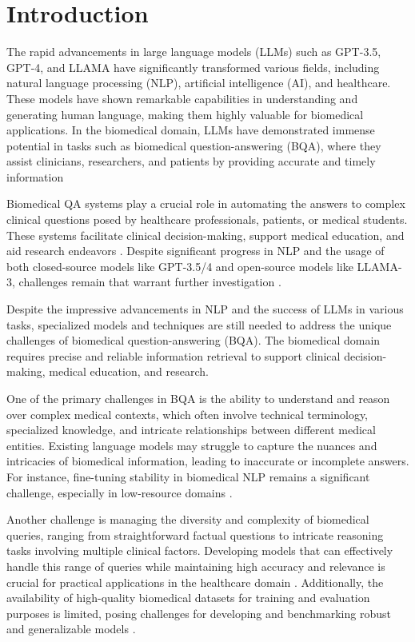\documentclass[onecolumn, conference]{IEEEtran}
\begin{document}
\section{Introduction}
The rapid advancements in large language models (LLMs) such as GPT-3.5, GPT-4, and LLAMA have significantly transformed various fields, including natural language processing (NLP), artificial intelligence (AI), and healthcare. These models have shown remarkable capabilities in understanding and generating human language, making them highly valuable for biomedical applications. In the biomedical domain, LLMs have demonstrated immense potential in tasks such as biomedical question-answering (BQA), where they assist clinicians, researchers, and patients by providing accurate and timely information \cite{Hiesinger2023}

Biomedical QA systems play a crucial role in automating the answers to complex clinical questions posed by healthcare professionals, patients, or medical students. These systems facilitate clinical decision-making, support medical education, and aid research endeavors \cite{Jin2021}. Despite significant progress in NLP and the usage of both closed-source models like GPT-3.5/4 and open-source models like LLAMA-3, challenges remain that warrant further investigation \cite{Kalyan2021}.

Despite the impressive advancements in NLP and the success of LLMs in various tasks, specialized models and techniques are still needed to address the unique challenges of biomedical question-answering (BQA). The biomedical domain requires precise and reliable information retrieval to support clinical decision-making, medical education, and research.

One of the primary challenges in BQA is the ability to understand and reason over complex medical contexts, which often involve technical terminology, specialized knowledge, and intricate relationships between different medical entities. Existing language models may struggle to capture the nuances and intricacies of biomedical information, leading to inaccurate or incomplete answers. For instance, fine-tuning stability in biomedical NLP remains a significant challenge, especially in low-resource domains \cite{Tinn2021}.

Another challenge is managing the diversity and complexity of biomedical queries, ranging from straightforward factual questions to intricate reasoning tasks involving multiple clinical factors. Developing models that can effectively handle this range of queries while maintaining high accuracy and relevance is crucial for practical applications in the healthcare domain \cite{Tran2023}. Additionally, the availability of high-quality biomedical datasets for training and evaluation purposes is limited, posing challenges for developing and benchmarking robust and generalizable models \cite{Wang2023} \cite{Wang2023a}.
\end{document}

